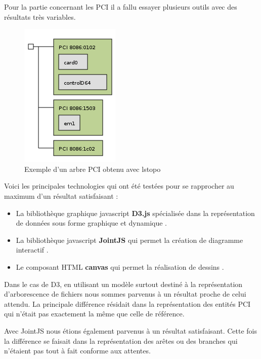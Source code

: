 \documentclass [a4paper,11pt]{article}
\begin{document}
Pour la partie concernant les PCI il a fallu essayer plusieurs outils avec des résultats très variables. 

\begin{figure}[!h]
\centering
\includegraphics[scale=0.5]{img/treePCI.png}
\caption[Résultats]{Exemple d'un arbre PCI obtenu avec lstopo}
\end{figure}

Voici les principales technologies qui ont été testées pour se rapprocher au maximum d’un résultat satisfaisant :
\newline

\begin{itemize}
 \item La bibliothèque graphique javascript \textbf{D3.js} spécialisée dans la représentation de données sous forme graphique et dynamique \cite{d3}.
 \item La bibliothèque javascript \textbf{JointJS} qui permet la création de diagramme interactif \cite{jointjs}.
 \item Le composant HTML \textbf{canvas} qui permet la réalisation de dessins \cite{canvas}.
 \newline
\end{itemize}

Dans le cas de D3, en utilisant un modèle surtout destiné à la représentation d’arborescence de fichiers \cite{Bostock16} nous sommes parvenus à un résultat proche de celui attendu. La principale différence résidait dans la représentation des entités PCI qui n’était pas exactement la même que celle de référence.
\newline

Avec JointJS nous étions également parvenus à un résultat satisfaisant. Cette fois la différence se faisait dans la représentation des arêtes ou des branches qui n’étaient pas tout à fait conforme aux attentes.
\newline
\end{document}
